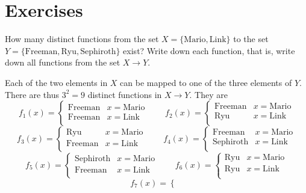 \section*{Exercises}

\begin{excersizelist}

\item How many distinct functions from the set $X = \{\text{Mario}, \text{Link}\}$ to the set $Y = \{\text{Freeman}, \text{Ryu}, \text{Sephiroth}\}$ exist?  Write down each function, that is, write down all functions from the set $X \to Y$.

\begin{solution}
Each of the two elements in $X$ can be mapped to one of the three elements of $Y$.  There are thus $3^2 = 9$ distinct functions in $X \to Y$.  They are
\[
f_1(x) = \begin{cases}
\text{Freeman} & x = \text{Mario} \\
\text{Freeman} & x = \text{Link} \\
\end{cases}
\qquad 
f_2(x) = \begin{cases}
\text{Freeman} & x = \text{Mario} \\
\text{Ryu} & x = \text{Link} \\
\end{cases}
\]
\[
f_3(x) = \begin{cases}
\text{Ryu} & x = \text{Mario} \\
\text{Freeman} & x = \text{Link} \\
\end{cases}
\qquad 
f_4(x) = \begin{cases}
\text{Freeman} & x = \text{Mario} \\
\text{Sephiroth} & x = \text{Link} \\
\end{cases}
\]
\[
f_5(x) = \begin{cases}
\text{Sephiroth} & x = \text{Mario} \\
\text{Freeman} & x = \text{Link} \\
\end{cases}
\qquad 
f_6(x) = \begin{cases}
\text{Ryu} & x = \text{Mario} \\
\text{Ryu} & x = \text{Link} \\
\end{cases}
\]
\[
f_7(x) = \begin{cases}

\end{cases}\]
\end{solution}
\end{excersizelist}
